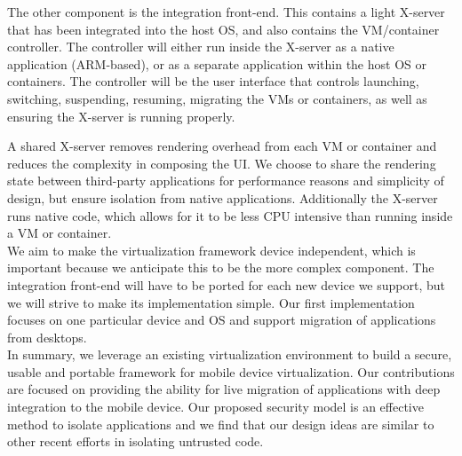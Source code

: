 The other component is the integration front-end. This contains a light X-server that has been integrated into the host OS, and also contains the VM/container controller. The controller will either run inside the X-server as a native application (ARM-based), or as a separate application within the host OS or containers. The controller will be the user interface that controls launching, switching, suspending, resuming, migrating the VMs or containers, as well as ensuring the X-server is running properly. %

A shared X-server removes rendering overhead from each VM or container and reduces the complexity in composing the UI. We choose to share the rendering state between third-party applications for performance reasons and simplicity of design, but ensure isolation from native applications. Additionally the X-server runs native code, which allows for it to be less CPU intensive than running inside a VM or container. \\

We aim to make the virtualization framework device independent, which is important because we anticipate this to be the more complex component. The integration front-end will have to be ported for each new device we support, but we will strive to make its implementation simple. Our first implementation focuses on one particular device and OS and support  migration of applications from desktops. \\

In summary, we leverage an existing virtualization environment to build a secure, usable and portable framework for mobile device virtualization. Our contributions are focused on providing the ability for live migration of applications with deep integration to the mobile device. Our proposed security model is an effective method to isolate applications and we find that our design ideas are similar to other recent efforts \cite{grier2008secure} in isolating untrusted code.

